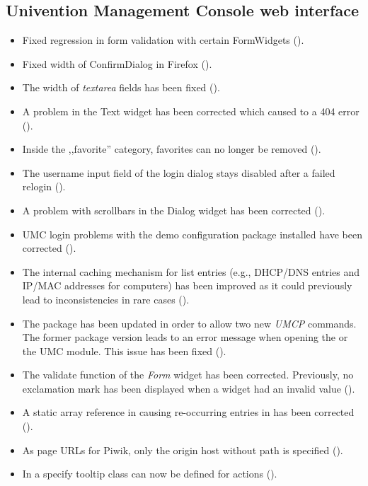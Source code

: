 \subsection{Univention Management Console web interface}
\begin{itemize}
\item Fixed regression in form validation with certain FormWidgets
  ().
\item Fixed width of ConfirmDialog in Firefox ().
\item The width of \emph{textarea} fields has been fixed
  ().
\item A problem in the Text widget has been corrected which caused to
  a 404 error ().
\item Inside the ,,favorite'' category, favorites can no longer be
  removed ().
\item The username input field of the login dialog stays disabled
  after a failed relogin ().
\item A problem with scrollbars in the Dialog widget has been
  corrected ().
\item UMC login problems with the demo configuration package installed have
  been corrected ().
\item The internal caching mechanism for list entries (e.g., DHCP/DNS
  entries and IP/MAC addresses for computers) has been improved as it
  could previously lead to inconsistencies in rare cases ().
\item The  package has been
  updated in order to allow two new \emph{UMCP} commands. The former
  package version leads to an error message when opening the
   or the  UMC module. This
  issue has been fixed ().
\item The validate function of the \emph{Form} widget has been corrected.
  Previously, no exclamation mark has been displayed when a widget had an
  invalid value ().
\item A static array reference in  causing re-occurring
  entries in  has been corrected ().
\item As page URLs for Piwik, only the origin host without path is specified ().
\item In  a specify tooltip class can now be defined for actions ().
\end{itemize}

